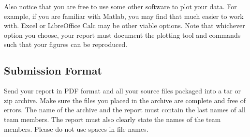 \documentclass[a4paper,10pt]{article}
\begin{document}
Also notice that you are free to use some other software to plot your data.
For example, if you are familiar with Matlab, you may find that much easier to work with.
Excel or LibreOffice Calc may be other viable options.
Note that whichever option you choose, your report must document the plotting tool and commands such that your figures can be reproduced.

\subsection*{Submission Format}

Send your report in PDF format and all your source files packaged into a tar or zip archive.
Make sure the files you placed in the archive are complete and free of errors.
The name of the archive and the report must contain the last names of all team members.
The report must also clearly state the names of the team members.
Please do not use spaces in file names.



\footnotesize


\end{document}
